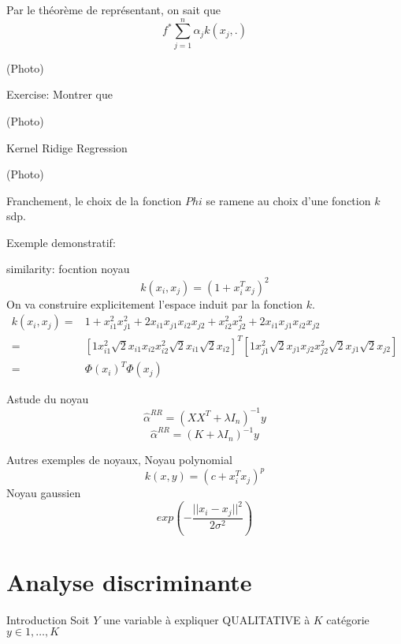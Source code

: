 \documentclass{article}
\begin{document}
Par le th\'eor\`eme de repr\'esentant, on sait que 
\begin{equation}
f^*\sum_{j=1}^n\alpha_j k(x_j,.)
\end{equation}

(Photo)

Exercise: Montrer que

(Photo)

Kernel Ridige Regression

(Photo)

Franchement, le choix de la fonction $Phi$ se ramene au choix d'une fonction $k$ sdp.

Exemple demonstratif:

similarity:
focntion noyau
\begin{equation}
k(x_i,x_j)=(1+x_i^Tx_j)^2
\end{equation}
On va construire explicitement l'espace induit par la fonction $k$.
\begin{equation}
\begin{split}
k(x_i,x_j)=&1+x_{i1}^2x_{j1}^2+2x_{i1}x_{j1}x_{i2}x_{j2}+x_{i2}^2x_{j2}^2+2x_{i1}x_{j1}x_{i2}x_{j2}\\
=&[1 x_{i1}^2 \sqrt{2}x_{i1}x_{i2} x_{i2}^2 \sqrt{2}x_{i1} \sqrt{2}x_{i2}]^T[1 x_{j1}^2 \sqrt{2}x_{j1}x_{j2} x_{j2}^2 \sqrt{2}x_{j1} \sqrt{2}x_{j2}]\\
=&\Phi(x_i)^T\Phi(x_j)
\end{split}
\end{equation}

Astude du noyau
\begin{equation}
\hat{\alpha}^{RR}=(XX^T+\lambda I_n)^{-1}y
\end{equation}
\begin{equation}
\hat{\alpha}^{RR}=(K+\lambda I_n)^{-1}y
\end{equation}

Autres exemples de noyaux,
Noyau polynomial
\begin{equation}
k(x,y)=(c+x_i^Tx_j)^p
\end{equation}
Noyau gaussien
\begin{equation}
exp(-\frac{||x_i-x_j||^2}{2\sigma^2})
\end{equation}

\section{Analyse discriminante}
Introduction
Soit $Y$ une variable \`a expliquer QUALITATIVE \`a $K$ cat\'egorie $y\in{1,\ldots,K}$
\end{document}
